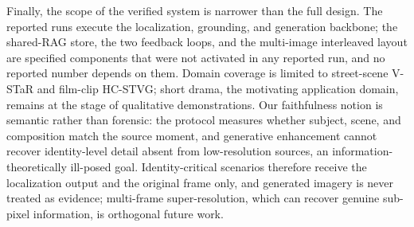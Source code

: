 Finally, the scope of the verified system is narrower than the full design. The reported runs execute the localization, grounding, and generation backbone; the shared-RAG store, the two feedback loops, and the multi-image interleaved layout are specified components that were not activated in any reported run, and no reported number depends on them. Domain coverage is limited to street-scene V-STaR \citep{vstar2503} and film-clip HC-STVG; short drama, the motivating application domain, remains at the stage of qualitative demonstrations. Our faithfulness notion is semantic rather than forensic: the protocol measures whether subject, scene, and composition match the source moment, and generative enhancement cannot recover identity-level detail absent from low-resolution sources, an information-theoretically ill-posed goal. Identity-critical scenarios therefore receive the localization output and the original frame only, and generated imagery is never treated as evidence; multi-frame super-resolution, which can recover genuine sub-pixel information, is orthogonal future work.
